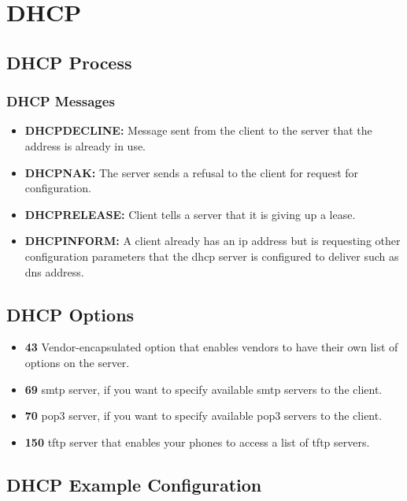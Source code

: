 \chapter{DHCP}

\section{DHCP Process}


\subsection{DHCP Messages}

\begin{itemize}
    \item \textbf{DHCPDECLINE:} Message sent from the client to the server that the address is already in use.
    \item \textbf{DHCPNAK:} The server sends a refusal to the client for request for configuration.
    \item \textbf{DHCPRELEASE:} Client tells a server that it is giving up a lease.
    \item \textbf{DHCPINFORM:} A client already has an \gls{ip} address but is requesting other configuration parameters that the \gls{dhcp} server is configured to deliver such as \gls{dns} address.
\end{itemize}

\section{DHCP Options}

\begin{itemize}
    \item \textbf{43} Vendor-encapsulated option that enables vendors to have their own list of options on the server.
    \item \textbf{69} \gls{smtp} server, if you want to specify available \gls{smtp} servers to the client.
    \item \textbf{70} \gls{pop3} server, if you want to specify available \gls{pop3} servers to the client.
    \item \textbf{150} \gls{tftp} server that enables your phones to access a list of \gls{tftp} servers.
\end{itemize}

\section{DHCP Example Configuration}


